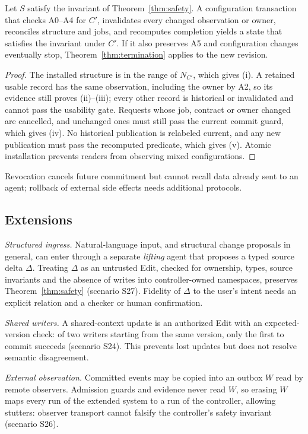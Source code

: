 \begin{theorem}\label{thm:reconfig}
Let $S$ satisfy the invariant of Theorem~\ref{thm:safety}. A configuration transaction that checks A0--A4 for $C'$, invalidates every changed observation or owner, reconciles structure and jobs, and recomputes completion yields a state that satisfies the invariant under $C'$. If it also preserves A5 and configuration changes eventually stop, Theorem~\ref{thm:termination} applies to the new revision.
\end{theorem}
\begin{proof}
The installed structure is in the range of $N_{C'}$, which gives (i). A retained usable record has the same observation, including the owner by A2, so its evidence still proves (ii)--(iii); every other record is historical or invalidated and cannot pass the usability gate. Requests whose job, contract or owner changed are cancelled, and unchanged ones must still pass the current commit guard, which gives (iv). No historical publication is relabeled current, and any new publication must pass the recomputed predicate, which gives (v). Atomic installation prevents readers from observing mixed configurations.
\end{proof}

Revocation cancels future commitment but cannot recall data already sent to an agent; rollback of external side effects needs additional protocols.

\subsection{Extensions}\label{sec:extensions}
\emph{Structured ingress.} Natural-language input, and structural change proposals in general, can enter through a separate \emph{lifting} agent that proposes a typed source delta $\Delta$. Treating $\Delta$ as an untrusted Edit, checked for ownership, types, source invariants and the absence of writes into controller-owned namespaces, preserves Theorem~\ref{thm:safety} (scenario S27). Fidelity of $\Delta$ to the user's intent needs an explicit relation and a checker or human confirmation.

\emph{Shared writers.} A shared-context update is an authorized Edit with an expected-version check: of two writers starting from the same version, only the first to commit succeeds (scenario S24). This prevents lost updates but does not resolve semantic disagreement.

\emph{External observation.} Committed events may be copied into an outbox $W$ read by remote observers. Admission guards and evidence never read $W$, so erasing $W$ maps every run of the extended system to a run of the controller, allowing stutters: observer transport cannot falsify the controller's safety invariant (scenario S26).

